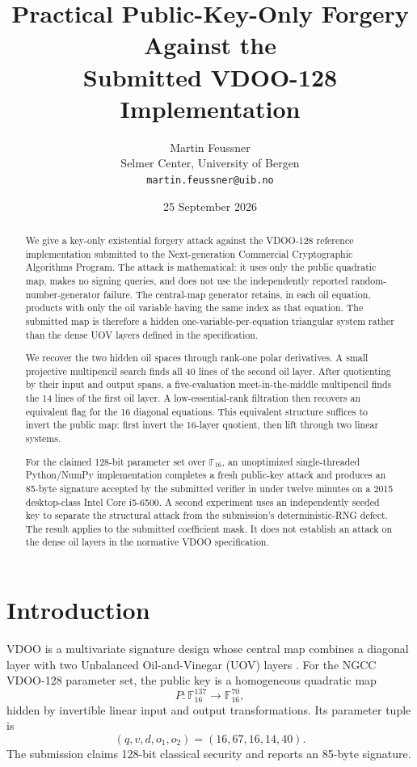 \documentclass[11pt]{article}
\title{\bfseries Practical Public-Key-Only Forgery Against the\\
Submitted VDOO-128 Implementation}
\author{Martin Feussner\\
\small Selmer Center, University of Bergen\\
\small \texttt{martin.feussner@uib.no}}
\date{25 September 2026}
\newcommand{\F}{\mathbb{F}}
\begin{document}
\maketitle

\begin{abstract}
We give a key-only existential forgery attack against the VDOO-128 reference
implementation submitted to the Next-generation Commercial Cryptographic
Algorithms Program.  The attack is mathematical: it uses only the public
quadratic map, makes no signing queries, and does not use the independently
reported random-number-generator failure.  The central-map generator retains,
in each oil equation, products with only the oil variable having the same
index as that equation.  The submitted map is therefore a hidden
one-variable-per-equation triangular system rather than the dense UOV layers
defined in the specification.

We recover the two hidden oil spaces through rank-one polar derivatives.  A
small projective multipencil search finds all 40 lines of the second oil layer.
After quotienting by their input and output spans, a five-evaluation
meet-in-the-middle multipencil finds the 14 lines of the first oil layer.  A
low-essential-rank filtration then recovers an equivalent flag for the 16
diagonal equations.  This equivalent structure suffices to invert the public
map: first invert the 16-layer quotient, then lift through two linear systems.

For the claimed 128-bit parameter set over $\F_{16}$, an unoptimized
single-threaded Python/NumPy implementation completes a fresh public-key attack
and produces an 85-byte signature accepted by the submitted verifier in under
twelve minutes on a 2015 desktop-class Intel Core i5-6500.  A second experiment
uses an independently seeded key to separate the structural attack from the
submission's deterministic-RNG defect.  The result applies to the submitted
coefficient mask.  It does not establish an attack on the dense oil layers in
the normative VDOO specification.
\end{abstract}

\section{Introduction}

VDOO is a multivariate signature design whose central map combines a diagonal
layer with two Unbalanced Oil-and-Vinegar (UOV) layers
\cite{vdoo-original,vdoo-spec}.  For the NGCC VDOO-128 parameter set, the
public key is a homogeneous quadratic map
\[
       P:\F_{16}^{137}\longrightarrow\F_{16}^{70},
\]
hidden by invertible linear input and output transformations.  Its parameter
tuple is
\[
       (q,v,d,o_1,o_2)=(16,67,16,14,40).
\]
The submission claims 128-bit classical security and reports an 85-byte
signature.
\end{document}
